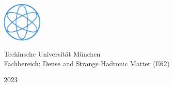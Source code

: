 \documentclass[12pt,twoside]{article}
\begin{document}
{  
  \vspace*{\fill}
  
  
  
  \includegraphics[width=0.15\textwidth]{../figures/PH_CMYK-eps-converted-to.pdf}
  \\[0.3\baselineskip] %
  
  \null
  \vfill
  
  \vspace{1em}
  \large Techinsche Universität München\\
   \vspace{0.5em}
  \large Fachbereich: Dense and Strange Hadronic Matter (E62)\\
  \vspace{0.5em}
  
  {\scshape 2023} \\[0.3\baselineskip] %
  
}

\newpage\null\thispagestyle{empty}\newpage



\newpage\null\thispagestyle{empty}\newpage



\newpage\null\thispagestyle{empty}\newpage


\restoregeometry
{}
\setcounter{page}{1}
\tableofcontents
\newpage
{}
\pagestyle{headings}

\newpage\null\thispagestyle{empty}\newpage

\newpage\null\thispagestyle{empty}\newpage

\newpage

\newpage\null\thispagestyle{empty}\newpage

\newpage\null\thispagestyle{empty}\newpage
\newpage\null\thispagestyle{empty}\newpage


\appendix

\newpage\null\thispagestyle{empty}\newpage


\newpage\null\thispagestyle{empty}\newpage
\listoffigures
\newpage
\listoftables
\newpage\null\thispagestyle{empty}\newpage

\end{document}
